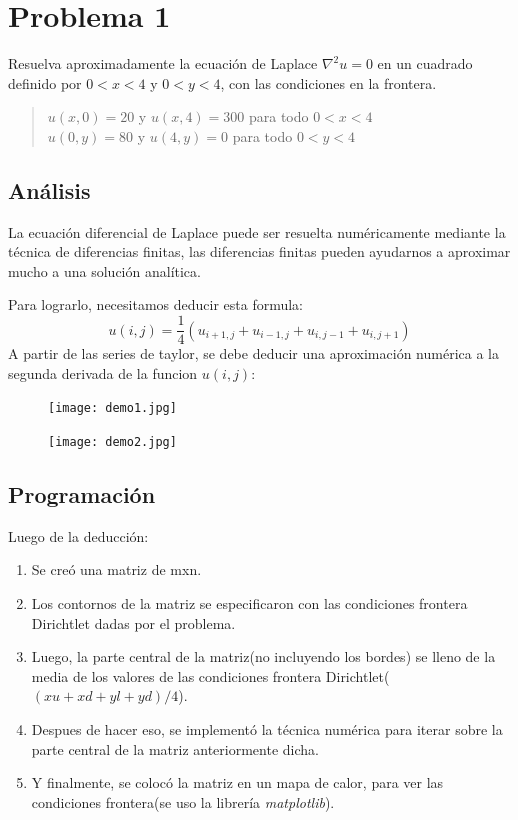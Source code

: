 \documentclass[a4paper,12pt]{article}
\newcommand{\eq}[1]{$#1$}
\begin{document}
    \section{Problema 1}
    Resuelva aproximadamente la ecuación de Laplace \eq{\nabla^2u = 0} en un
    cuadrado definido por \eq{0 < x < 4} y \eq{ 0 < y < 4}, con las condiciones en la
    frontera.
    \begin{quote}
        \centering
        \eq{u(x,0) = 20} y \eq{u(x,4) = 300} para todo \eq{0 < x <4}\\
        \eq{u(0,y) = 80} y \eq{u(4,y) = 0} para todo \eq{0 < y <4}
    \end{quote}
    \newpage
    \subsection{Análisis}
    La ecuación diferencial de Laplace puede ser resuelta 
    numéricamente mediante la técnica de 
    diferencias finitas, las diferencias finitas pueden 
    ayudarnos a aproximar mucho a una solución analítica.
    
    Para lograrlo, necesitamos deducir esta formula:
    \begin{equation}
        u(i,j) = \frac{1}{4}(u_{i+1,j}+u_{i-1,j}+u_{i,j-1}+u_{i,j+1})
    \end{equation}
    A partir de las series de taylor, se debe deducir una aproximación numérica a 
    la segunda derivada de la funcion \eq{u(i,j)}:
    \begin{figure}[h]
        \centering
        \texttt{[image: demo1.jpg]}
    \end{figure}
    \begin{figure}[h]
        \centering
        \texttt{[image: demo2.jpg]}
    \end{figure}
    \newpage
    \subsection{Programación}
    Luego de la deducción:
    \begin{enumerate}
        \item Se creó una matriz de m{\scriptsize x}n.
        \item Los contornos de la matriz se especificaron con las condiciones frontera Dirichtlet dadas por el problema.
        \item Luego, la parte central de la matriz(no incluyendo los bordes) 
        se lleno de la media de los valores de las condiciones frontera Dirichtlet(\eq{(xu+xd+yl+yd)/4}).
        \item Despues de hacer eso, se implementó la técnica numérica para iterar sobre la parte central de la matriz anteriormente dicha.
        \item Y finalmente, se colocó la matriz en un mapa de calor, para ver las condiciones frontera(se uso la librería \emph{matplotlib}).
    \end{enumerate}
\end{document}

